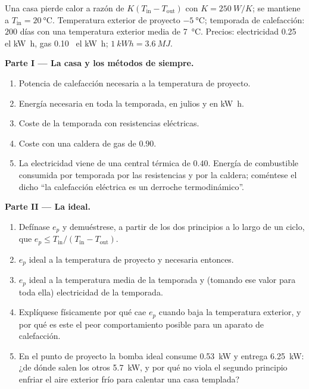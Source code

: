 \begin{problem}
\label{pb:b1:heat-engines:1}
Una casa pierde calor a razón de $K(T_{\mathrm{in}} - T_{\mathrm{out}})$ con
$K = \qty{250}{W/K}$; se mantiene a $T_{\mathrm{in}} = \qty{20}{\degreeCelsius}$.
Temperatura exterior de proyecto $\qty{-5}{\degreeCelsius}$; temporada de
calefacción: $200$ días con una temperatura exterior media de \qty{7}{\degreeCelsius}.
Precios: electricidad 0.25~\texteuro{} el \unit{kW h}, gas 0.10~\texteuro{} el
\unit{kW h}; $\qty{1}{kW h} = \qty{3.6}{MJ}$.

\medskip
\noindent\textbf{Parte I --- La casa y los métodos de siempre.}
\begin{enumerate}
  \item Potencia de calefacción necesaria a la temperatura de proyecto.
  \item Energía necesaria en toda la temporada, en julios y en \unit{kW h}.
  \item Coste de la temporada con resistencias eléctricas.
  \item Coste con una caldera de gas de  $0.90$.
  \item La electricidad viene de una central térmica de 
        $0.40$. Energía de combustible consumida por temporada por las
        resistencias y por la caldera; coméntese el dicho ``la calefacción
        eléctrica es un derroche termodinámico''.
\end{enumerate}

\medskip
\noindent\textbf{Parte II --- La  ideal.}
\begin{enumerate}[resume]
  \item Defínase $e_p$ y demuéstrese, a partir de los dos principios a lo
        largo de un ciclo, que $e_p \leq T_{\mathrm{in}}/(T_{\mathrm{in}} - T_{\mathrm{out}})$.
  \item $e_p$ ideal a la temperatura de proyecto y 
        necesaria entonces.
  \item $e_p$ ideal a la temperatura media de la temporada y (tomando ese
        valor para toda ella) electricidad de la temporada.
  \item Explíquese físicamente por qué cae $e_p$ cuando baja la
        temperatura exterior, y por qué es este el peor comportamiento
        posible para un aparato de calefacción.
  \item En el punto de proyecto la bomba ideal consume \qty{0.53}{kW} y
        entrega \qty{6.25}{kW}: ¿de dónde salen los otros \qty{5.7}{kW}, y
        por qué no viola el segundo principio enfriar el aire exterior frío
        para calentar una casa templada?
\end{enumerate}


\end{problem}
